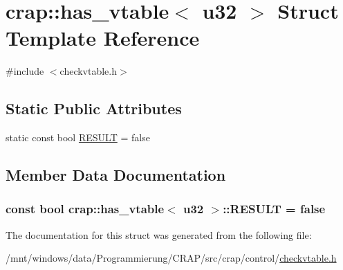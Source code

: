 \hypertarget{structcrap_1_1has__vtable_3_01u32_01_4}{\section{crap\-:\-:has\-\_\-vtable$<$ u32 $>$ Struct Template Reference}
\label{structcrap_1_1has__vtable_3_01u32_01_4}
}


{\ttfamily \#include $<$checkvtable.\-h$>$}

\subsection*{Static Public Attributes}
\begin{DoxyCompactItemize}
\item 
static const bool \hyperlink{structcrap_1_1has__vtable_3_01u32_01_4_ae6c7fc8ec5ff2421ff10eb15297e835f}{R\-E\-S\-U\-L\-T} = false
\end{DoxyCompactItemize}


\subsection{Member Data Documentation}
\hypertarget{structcrap_1_1has__vtable_3_01u32_01_4_ae6c7fc8ec5ff2421ff10eb15297e835f}{
\subsubsection[{R\-E\-S\-U\-L\-T}]{\setlength{\rightskip}{0pt plus 5cm}const bool {\bf crap\-::has\-\_\-vtable}$<$ {\bf u32} $>$\-::R\-E\-S\-U\-L\-T = false\hspace{0.3cm}{\ttfamily [static]}}}\label{structcrap_1_1has__vtable_3_01u32_01_4_ae6c7fc8ec5ff2421ff10eb15297e835f}


The documentation for this struct was generated from the following file\-:\begin{DoxyCompactItemize}
\item 
/mnt/windows/data/\-Programmierung/\-C\-R\-A\-P/src/crap/control/\hyperlink{checkvtable_8h}{checkvtable.\-h}\end{DoxyCompactItemize}

